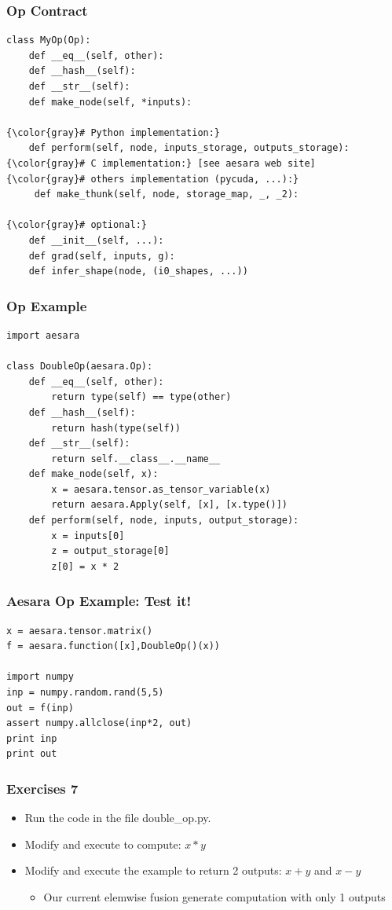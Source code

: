\documentclass[a4paper,9pt]{beamer}
\begin{document}
\begin{frame}[fragile]
\frametitle{Op Contract}
\begin{Verbatim}[commandchars=\\\{\}]
class MyOp(Op):
    def __eq__(self, other):
    def __hash__(self):
    def __str__(self):
    def make_node(self, *inputs):

{\color{gray}# Python implementation:}
    def perform(self, node, inputs_storage, outputs_storage):
{\color{gray}# C implementation:} [see aesara web site]
{\color{gray}# others implementation (pycuda, ...):}
     def make_thunk(self, node, storage_map, _, _2):

{\color{gray}# optional:}
    def __init__(self, ...):
    def grad(self, inputs, g):
    def infer_shape(node, (i0_shapes, ...))
\end{Verbatim}
\end{frame}

\begin{frame}[fragile]
\frametitle{Op Example}
\begin{Verbatim}
import aesara

class DoubleOp(aesara.Op):
    def __eq__(self, other):
        return type(self) == type(other)
    def __hash__(self):
        return hash(type(self))
    def __str__(self):
        return self.__class__.__name__
    def make_node(self, x):
        x = aesara.tensor.as_tensor_variable(x)
        return aesara.Apply(self, [x], [x.type()])
    def perform(self, node, inputs, output_storage):
        x = inputs[0]
        z = output_storage[0]
        z[0] = x * 2

\end{Verbatim}
\end{frame}

\begin{frame}[fragile]
\frametitle{Aesara Op Example: Test it!}
\begin{Verbatim}
x = aesara.tensor.matrix()
f = aesara.function([x],DoubleOp()(x))

import numpy
inp = numpy.random.rand(5,5)
out = f(inp)
assert numpy.allclose(inp*2, out)
print inp
print out
\end{Verbatim}
\end{frame}

\begin{frame}
\frametitle{Exercises 7}
\begin{itemize}
\item Run the code in the file double\_op.py.
\item Modify and execute to compute: $x * y$
\item Modify and execute the example to return 2 outputs: $x + y$ and $x - y$
  \begin{itemize}
  \item Our current elemwise fusion generate computation with only 1 outputs
  \end{itemize}
\end{itemize}
\end{frame}
\end{document}
